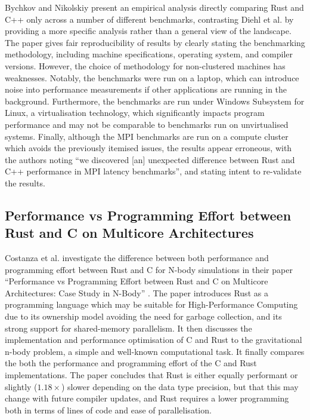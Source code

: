 Bychkov and Nikolskiy present an empirical analysis directly comparing Rust and C++ only across a number of different benchmarks, contrasting Diehl et al. by providing a more specific analysis rather than a general view of the landscape. The paper gives fair reproducibility of results by clearly stating the benchmarking methodology, including machine specifications, operating system, and compiler versions. However, the choice of methodology for non-clustered machines has weaknesses. Notably, the benchmarks were run on a laptop, which can introduce noise into performance measurements if other applications are running in the background. Furthermore, the benchmarks are run under Windows Subsystem for Linux, a virtualisation technology, which significantly impacts program performance and may not be comparable to benchmarks run on unvirtualised systems. Finally, although the MPI benchmarks are run on a compute cluster which avoids the previously itemised issues, the results appear erroneous, with the authors noting ``we discovered [an] unexpected difference between Rust and C++ performance in MPI latency benchmarks'', and stating intent to re-validate the results.




\subsection{Performance vs Programming Effort between Rust and C on Multicore Architectures}
\label{ssec:costanza-et-al}

Costanza et al. investigate the difference between both performance and programming effort between Rust and C for N-body simulations in their paper ``Performance vs Programming Effort between Rust and C on Multicore Architectures: Case Study in N-Body'' \cite{costanzoPerformanceVsProgramming2021}. The paper introduces Rust as a programming language which may be suitable for High-Performance Computing due to its ownership model avoiding the need for garbage collection, and its strong support for shared-memory parallelism. It then discusses the implementation and performance optimisation of C and Rust to the gravitational n-body problem, a simple and well-known computational task. It finally compares the both the performance and programming effort of the C and Rust implementations. The paper concludes that Rust is either equally performant or slightly ($1.18\times$) slower depending on the data type precision, but that this may change with future compiler updates, and Rust requires a lower programming both in terms of lines of code and ease of parallelisation.

